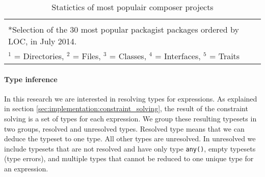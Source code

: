 \documentclass[../main.tex]{subfiles}
\begin{document}
\begin{table}[H]
\begin{tabular}{@{}lllrrrrrrrr@{}}
  \bottomrule
     \multicolumn{11}{l}{} \\
     \multicolumn{11}{l}{*Selection of the 30 most popular packagist packages ordered by LOC, in July 2014.} \\
     \multicolumn{11}{l}{$^1$ = Directories, $^2$ = Files, $^3$ = Classes, $^4$ = Interfaces, $^5$ = Traits} \\
  \end{tabular}
  \normalsize
  \caption{Statictics of most populair composer projects\label{table:corpus}}
\end{table}
\npfourdigitnosep
\npnoaddmissingzero

	\paragraph{Type inference}
	In this research we are interested in resolving types for expressions.
	As explained in section \ref{sec:implementation:constraint_solving}, the result of the constraint solving is a set of types for each expression.
	We group these resulting typesets in two groups, resolved and unresolved types.
	Resolved type means that we can deduce the typeset to one type.
	All other types are unresolved.
	In unresolved we include typesets that are not resolved and have only type \texttt{any()}, empty typesets (type errors), and multiple types that cannot be reduced to one unique type for an expression.
	
\end{document}
